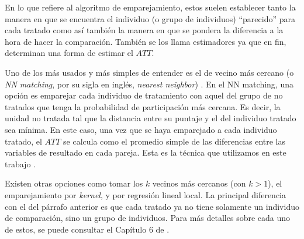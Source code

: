 \documentclass[../../main.tex]{subfiles}
\begin{document}
En lo que refiere al algoritmo de emparejamiento, estos suelen establecer tanto la manera
en que se encuentra el individuo (o grupo de individuos) ``parecido'' para cada tratado
como así también la manera en que se pondera la diferencia a la hora de hacer la
comparación. También se los llama estimadores ya que en fin, determinan una forma de
estimar el \(ATT\).

Uno de los más usados y más simples de entender es el de vecino más cercano (o \textit{NN
matching}, por su sigla en inglés, \textit{nearest neighbor}) \cite{bernal}. En el NN
matching, una opción es emparejar cada individuo de tratamiento con aquel del grupo de no
tratados que tenga la probabilidad de participación más cercana. Es decir, la unidad no
tratada tal que la distancia entre su puntaje y el del individuo tratado sea mínima. En
este caso, una vez que se haya emparejado a cada individuo tratado, el \(ATT\) se calcula
como el promedio simple de las diferencias entre las variables de resultado en cada
pareja. Esta es la técnica que utilizamos en este trabajo \footnotemark.

Existen otras opciones como tomar los \(k\) vecinos más cercanos (con \(k > 1\)), el
emparejamiento por \textit{kernel}, y por regresión lineal local. La principal diferencia
con el del párrafo anterior es que cada tratado ya no tiene solamente un individuo de
comparación, sino un grupo de individuos. Para más detalles sobre cada uno de estos, se
puede consultar el Capítulo 6 de \cite{bernal}.

\end{document}
